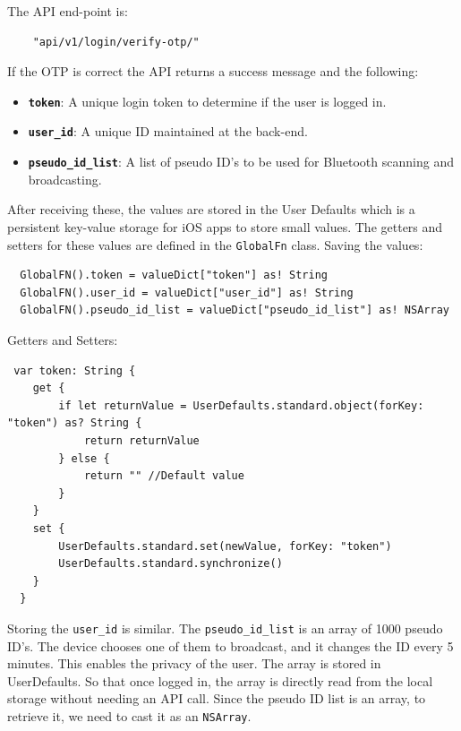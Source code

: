 \documentclass[12pt, conference, a4paper]{article}
\begin{document}
The API end-point is:
\begin{verbatim}
	"api/v1/login/verify-otp/"
\end{verbatim}
If the OTP is correct the API returns a success message and the following: 
\begin{itemize}
  \item \textbf{\texttt{token}}: A unique login token to determine if the user is logged in. 
  \item \textbf{\texttt{user_id}}: A unique ID maintained at the back-end.
  \item \textbf{\texttt{pseudo_id_list}}: A list of pseudo ID’s to be used for Bluetooth scanning and broadcasting.
\end{itemize}
After receiving these, the values are stored in the User Defaults which is a persistent key-value storage for iOS apps to store small values. The getters and setters for these values are defined in the \texttt{GlobalFn} class. 
\newpage
Saving the values: 
\begin{verbatim}
  GlobalFN().token = valueDict["token"] as! String
  GlobalFN().user_id = valueDict["user_id"] as! String
  GlobalFN().pseudo_id_list = valueDict["pseudo_id_list"] as! NSArray
\end{verbatim}
Getters and Setters: 
\begin{verbatim}
 var token: String {
    get {
        if let returnValue = UserDefaults.standard.object(forKey: "token") as? String {
            return returnValue
        } else {
            return "" //Default value
        }
    }
    set {
        UserDefaults.standard.set(newValue, forKey: "token")
        UserDefaults.standard.synchronize()
    }
  }
\end{verbatim}
Storing the \texttt{user_id} is similar. The \texttt{pseudo_id_list} is an array of 1000 pseudo ID's. The device chooses one of them to broadcast, and it changes the ID every 5 minutes. This enables the privacy of the user. 
The array is stored in UserDefaults. So that once logged in, the array is directly read from the local storage without needing an API call. 
Since the pseudo ID list is an array, to retrieve it, we need to cast it as an \texttt{NSArray}. 
\end{document}

